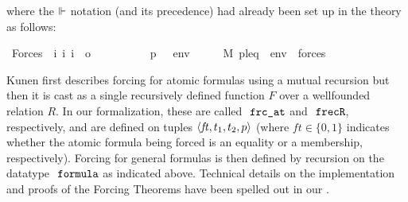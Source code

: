 where the $\Vdash$ notation (and its precedence) had already been set up in the
 theory as follows:
\begin{isabelle}
\isamarkupfalse%
\ Forces\ {\isacharcolon}{\kern0pt}{\isacharcolon}{\kern0pt}\ {\isachardoublequoteopen}{\isacharbrackleft}{\kern0pt}i{\isacharcomma}{\kern0pt}\ i{\isacharcomma}{\kern0pt}\ i{\isacharbrackright}{\kern0pt}\ {\isasymRightarrow}\ o{\isachardoublequoteclose}\ \ {\isacharparenleft}{\kern0pt}{\isachardoublequoteopen}{\isacharunderscore}{\kern0pt}\ {\isasymtturnstile}\ {\isacharunderscore}{\kern0pt}\ {\isacharunderscore}{\kern0pt}{\isachardoublequoteclose}\ {\isacharbrackleft}{\kern0pt}{}{}{\isacharcomma}{\kern0pt}{}{}{\isacharcomma}{\kern0pt}{}{}{\isacharbrackright}{\kern0pt}\ {}{}{\isacharparenright}{\kern0pt}\ \isanewline
\ \ {\isachardoublequoteopen}p\ {\isasymtturnstile}\ {\isasymphi}\ env\ \ \ {\isasymequiv}\ \ \ M{\isacharcomma}{\kern0pt}\ {\isacharparenleft}{\kern0pt}{\isacharbrackleft}{\kern0pt}p{\isacharcomma}{\kern0pt}{\isasymbbbP}{\isacharcomma}{\kern0pt}leq{\isacharcomma}{\kern0pt}{\isasymone}{\isacharbrackright}{\kern0pt}\ {\isacharat}{\kern0pt}\ env{\isacharparenright}{\kern0pt}\ {\isasymTurnstile}\ forces{\isacharparenleft}{\kern0pt}{\isasymphi}{\isacharparenright}{\kern0pt}{\isachardoublequoteclose}
\end{isabelle}

Kunen first describes forcing for atomic formulas using a mutual
recursion
but then \cite[p.~257]{kunen2011set} it is cast as a single
recursively defined function $F$ over a wellfounded  relation $R$.
In our formalization, these are called $\frcat$ and 
$\isatt{frecR}$, respectively, and are defined on tuples $\langle \mathit{ft},t_1,t_2,p\rangle$ (where
$\mathit{ft}\in\{0,1\}$ indicates whether the atomic formula being
forced is an equality or a membership, respectively).
Forcing for general formulas is then defined by recursion on the
datatype $\formula$ as indicated above. Technical details on the
implementation and proofs of the
Forcing Theorems have been spelled out in our
\cite{2020arXiv200109715G}.

